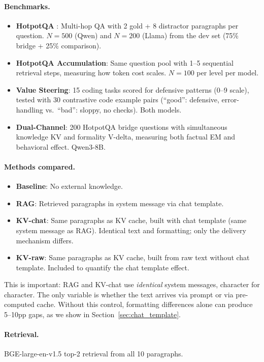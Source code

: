 \documentclass{article}
\begin{document}
\paragraph{Benchmarks.}
\begin{itemize}
    \item \textbf{HotpotQA} \citep{yang2018hotpotqa}: Multi-hop QA with 2 gold + 8 distractor paragraphs per question. $N{=}500$ (Qwen) and $N{=}200$ (Llama) from the dev set (75\% bridge + 25\% comparison).
    \item \textbf{HotpotQA Accumulation}: Same question pool with 1--5 sequential retrieval steps, measuring how token cost scales. $N{=}100$ per level per model.
    \item \textbf{Value Steering}: 15 coding tasks scored for defensive patterns (0--9 scale), tested with 30 contrastive code example pairs (``good'': defensive, error-handling vs.\ ``bad'': sloppy, no checks). Both models.
    \item \textbf{Dual-Channel}: 200 HotpotQA bridge questions with simultaneous knowledge KV and formality V-delta, measuring both factual EM and behavioral effect. Qwen3-8B.
\end{itemize}

\paragraph{Methods compared.}
\begin{itemize}
    \item \textbf{Baseline}: No external knowledge.
    \item \textbf{RAG}: Retrieved paragraphs in system message via chat template.
    \item \textbf{KV-chat}: Same paragraphs as KV cache, built with chat template (same system message as RAG). Identical text and formatting; only the delivery mechanism differs.
    \item \textbf{KV-raw}: Same paragraphs as KV cache, built from raw text without chat template. Included to quantify the chat template effect.
\end{itemize}

This is important: RAG and KV-chat use \textit{identical} system messages, character for character. The only variable is whether the text arrives via prompt or via pre-computed cache. Without this control, formatting differences alone can produce 5--10pp gaps, as we show in Section~\ref{sec:chat_template}.

\paragraph{Retrieval.} BGE-large-en-v1.5 \citep{xiao2023bge} top-2 retrieval from all 10 paragraphs.
\end{document}
